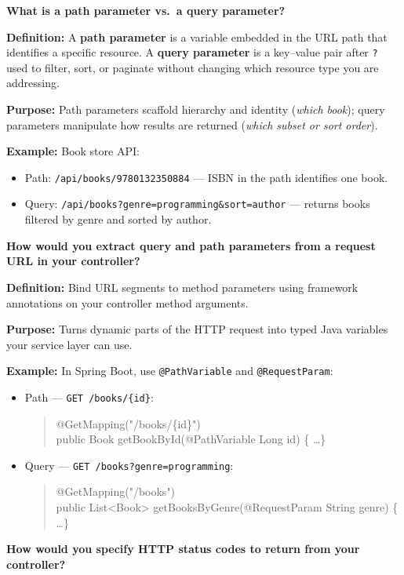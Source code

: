 \question[0]
\textbf{What is a path parameter vs.\ a query parameter?}

\textbf{Definition:} A \textbf{path parameter} is a variable embedded in the URL path that identifies a specific resource. A \textbf{query parameter} is a key--value pair after \texttt{?} used to filter, sort, or paginate without changing which resource type you are addressing.

\textbf{Purpose:} Path parameters scaffold hierarchy and identity (\emph{which book}); query parameters manipulate how results are returned (\emph{which subset or sort order}).

\textbf{Example:} Book store API:
\begin{itemize}
  \item Path: \texttt{/api/books/9780132350884} --- ISBN in the path identifies one book.
  \item Query: \texttt{/api/books?genre=programming\&sort=author} --- returns books filtered by genre and sorted by author.
\end{itemize}

\question[0]
\textbf{How would you extract query and path parameters from a request URL in your controller?}

\textbf{Definition:} Bind URL segments to method parameters using framework annotations on your controller method arguments.

\textbf{Purpose:} Turns dynamic parts of the HTTP request into typed Java variables your service layer can use.

\textbf{Example:} In Spring Boot, use \texttt{@PathVariable} and \texttt{@RequestParam}:
\begin{itemize}
  \item Path --- \texttt{GET /books/\{id\}}:
  \begin{quote}\small\ttfamily 
@GetMapping("/books/\{id\}")\\
public Book getBookById(@PathVariable Long id) \{ \ldots \}
  \end{quote}
  \item Query --- \texttt{GET /books?genre=programming}:
  \begin{quote}\small\ttfamily
@GetMapping("/books")\\
public List<Book> getBooksByGenre(@RequestParam String genre) \{ \ldots \}
  \end{quote}
\end{itemize}

\newpage

\question[0]
\textbf{How would you specify HTTP status codes to return from your controller?}


